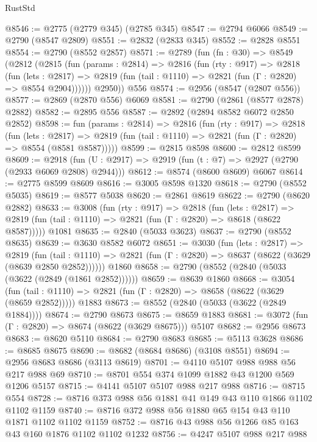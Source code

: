 \begin{lexlean}{RustStd}
\begin{coremodule}
@8546 := @2775 (@2779 @345) (@2785 @345)
@8547 := @2794 @6066
@8549 := @2790 (@8547 @2809)
@8551 := @2832 (@2833 @345)
@8552 := @2828 @8551
@8554 := @2790 (@8552 @2857)
@8571 := @2789
    (fun (fn : @30) =>
    @8549
      (@2812
        (@2815
          (fun (params : @2814) =>
          @2816
            (fun (rty : @917) =>
            @2818
              (fun (lets : @2817) =>
              @2819 (fun (tail : @1110) => @2821 (fun (Γ : @2820) => @8554 @2904))))))
        @2950))
    @556
@8574 := @2956 (@8547 (@2807 @556))
@8577 := @2869 (@2870 @556) @6069
@8581 := @2790 (@2861 (@8577 @2878) @2882)
@8582 := @2895 @556
@8587 := @2892 (@2894 @8582 @6072 @2850 @2852)
@8598 := fun (params : @2814) =>
  @2816
    (fun (rty : @917) =>
    @2818
      (fun (lets : @2817) =>
      @2819 (fun (tail : @1110) => @2821 (fun (Γ : @2820) => @8554 (@8581 @8587)))))
@8599 := @2815 @8598
@8600 := @2812 @8599
@8609 := @2918 (fun (U : @2917) => @2919 (fun (t : @7) => @2927 (@2790 (@2933 @6069 @2808) @2944)))
@8612 := @8574 (@8600 @8609) @6067
@8614 := @2775 @8599 @8609
@8616 := @3005 @8598 @1320
@8618 := @2790 (@8552 @5035)
@8619 := @8577 @5038
@8620 := @2861 @8619
@8622 := @2790 (@8620 @2882)
@8633 := @3008
    (fun (rty : @917) =>
    @2818
      (fun (lets : @2817) =>
      @2819 (fun (tail : @1110) => @2821 (fun (Γ : @2820) => @8618 (@8622 @8587)))))
    @1081
@8635 := @2840 (@5033 @3623)
@8637 := @2790 (@8552 @8635)
@8639 := @3630 @8582 @6072
@8651 := @3030
    (fun (lets : @2817) =>
    @2819
      (fun (tail : @1110) => @2821 (fun (Γ : @2820) => @8637 (@8622 (@3629 (@8639 @2850 @2852))))))
    @1860
@8658 := @2790 (@8552 (@2840 (@5033 (@3622 (@2849 (@1861 @2852))))))
@8659 := @8639 @1860
@8668 := @3054
    (fun (tail : @1110) => @2821 (fun (Γ : @2820) => @8658 (@8622 (@3629 (@8659 @2852)))))
    @1883
@8673 := @8552 (@2840 (@5033 (@3622 (@2849 @1884))))
@8674 := @2790 @8673
@8675 := @8659 @1883
@8681 := @3072 (fun (Γ : @2820) => @8674 (@8622 (@3629 @8675))) @5107
@8682 := @2956 @8673
@8683 := @8620 @5110
@8684 := @2790 @8683
@8685 := @5113 @3628
@8686 := @8685 @8675
@8690 := @8682 (@8684 @8686) (@3108 @8551)
@8694 := @2956 @8683 @8686 (@3113 @8619)
@8701 := @4110 @5107 @988 @988 @56 @217 @988 @69
@8710 := @8701 @554 @374 @1099 @1882 @43 @1200 @569 @1206 @5157
@8715 := @4141 @5107 @5107 @988 @217 @988
@8716 := @8715 @554
@8728 := @8716 @373 @988 @56 @1881 @41 @149 @43 @110 @1866 @1102 @1102 @1159
@8740 := @8716 @372 @988 @56 @1880 @65 @154 @43 @110 @1871 @1102 @1102 @1159
@8752 := @8716 @43 @988 @56 @1266 @85 @163 @43 @160 @1876 @1102 @1102 @1232
@8756 := @4247 @5107 @988 @217 @988

\end{coremodule}
\end{lexlean}
